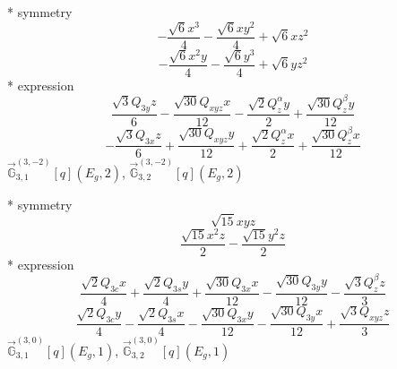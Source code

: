\documentclass[fleqn,8pt]{jsarticle}
\begin{document}
\noindent\quad ** symmetry
\begin{dmath*}
- \frac{\sqrt{6} x^{3}}{4} - \frac{\sqrt{6} x y^{2}}{4} + \sqrt{6} x z^{2}
\end{dmath*}
\begin{dmath*}
- \frac{\sqrt{6} x^{2} y}{4} - \frac{\sqrt{6} y^{3}}{4} + \sqrt{6} y z^{2}
\end{dmath*}
\noindent\quad ** expression
\begin{dmath*}
\frac{\sqrt{3} Q_{3y} z}{6} - \frac{\sqrt{30} Q_{xyz} x}{12} - \frac{\sqrt{2} Q_{z}^{\alpha} y}{2} + \frac{\sqrt{30} Q_{z}^{\beta} y}{12}
\end{dmath*}
\begin{dmath*}
- \frac{\sqrt{3} Q_{3x} z}{6} + \frac{\sqrt{30} Q_{xyz} y}{12} + \frac{\sqrt{2} Q_{z}^{\alpha} x}{2} + \frac{\sqrt{30} Q_{z}^{\beta} x}{12}
\end{dmath*}
\noindent\quad $\vec{\mathbb{G}}_{3,1}^{(3,-2)}[q](E_{g},2)$, $\vec{\mathbb{G}}_{3,2}^{(3,-2)}[q](E_{g},2)$

\noindent\quad ** symmetry
\begin{dmath*}
\sqrt{15} x y z
\end{dmath*}
\begin{dmath*}
\frac{\sqrt{15} x^{2} z}{2} - \frac{\sqrt{15} y^{2} z}{2}
\end{dmath*}
\noindent\quad ** expression
\begin{dmath*}
\frac{\sqrt{2} Q_{3c} x}{4} + \frac{\sqrt{2} Q_{3s} y}{4} + \frac{\sqrt{30} Q_{3x} x}{12} - \frac{\sqrt{30} Q_{3y} y}{12} - \frac{\sqrt{3} Q_{z}^{\beta} z}{3}
\end{dmath*}
\begin{dmath*}
\frac{\sqrt{2} Q_{3c} y}{4} - \frac{\sqrt{2} Q_{3s} x}{4} - \frac{\sqrt{30} Q_{3x} y}{12} - \frac{\sqrt{30} Q_{3y} x}{12} + \frac{\sqrt{3} Q_{xyz} z}{3}
\end{dmath*}
\noindent\quad $\vec{\mathbb{G}}_{3,1}^{(3,0)}[q](E_{g},1)$, $\vec{\mathbb{G}}_{3,2}^{(3,0)}[q](E_{g},1)$
\end{document}
